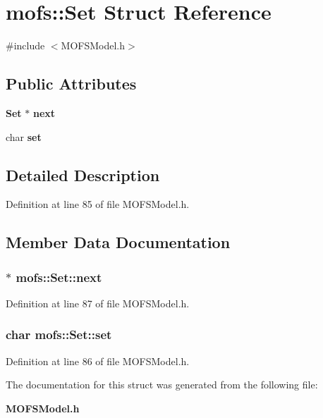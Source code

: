 \section{mofs\-:\-:Set Struct Reference}
\label{structmofs_1_1Set}


{\ttfamily \#include $<$M\-O\-F\-S\-Model.\-h$>$}

\subsection*{Public Attributes}
\begin{DoxyCompactItemize}
\item 
{\bf Set} $\ast$ {\bf next}
\item 
char {\bf set}
\end{DoxyCompactItemize}


\subsection{Detailed Description}


Definition at line 85 of file M\-O\-F\-S\-Model.\-h.



\subsection{Member Data Documentation}
\subsubsection[{next}]{$\ast$ mofs\-::\-Set\-::next}\label{structmofs_1_1Set_a972a6aab86cccb285acbae6900b74f77}


Definition at line 87 of file M\-O\-F\-S\-Model.\-h.

\subsubsection[{set}]{\setlength{\rightskip}{0pt plus 5cm}char mofs\-::\-Set\-::set}\label{structmofs_1_1Set_aff4f4bf9beec48c24dc00f14618f9e59}


Definition at line 86 of file M\-O\-F\-S\-Model.\-h.



The documentation for this struct was generated from the following file\-:\begin{DoxyCompactItemize}
\item 
{\bf M\-O\-F\-S\-Model.\-h}\end{DoxyCompactItemize}
